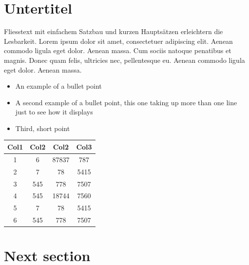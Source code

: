 \documentclass[a0,portrait]{a0poster}
\begin{document}
\begin{multicols}{3} %


\section{Untertitel}

\large
Fliesstext mit einfachem Satzbau und kurzen Hauptsätzen erleichtern die Lesbarkeit. Lorem ipsum dolor sit amet, consectetuer adipiscing elit. Aenean commodo ligula eget dolor. Aenean massa. Cum sociis natoque penatibus et magnis. Donec quam felis, ultricies nec, pellentesque eu. Aenean commodo ligula eget dolor. Aenean massa.

\begin{itemize}
\item An example of a bullet point
\item A second example of a bullet point, this one taking up more than one line just to see how it displays
\item Third, short point
\end{itemize}
\blindtext
\begin{center}
 \vspace{2cm}
 \begin{tabular}{c c c c} 
  \toprule
  Col1 & Col2 & Col2 & Col3 \\ [0.5ex] 
  \midrule
  1 & 6 & 87837 & 787 \\ 
  2 & 7 & 78 & 5415 \\
  3 & 545 & 778 & 7507 \\
  4 & 545 & 18744 & 7560 \\
  5 & 7 & 78 & 5415 \\
  6 & 545 & 778 & 7507 \\
  \bottomrule
 \end{tabular}
\vspace{2cm}
\end{center}


\section{Next section}
\blindtext


\end{multicols}
\end{document}
